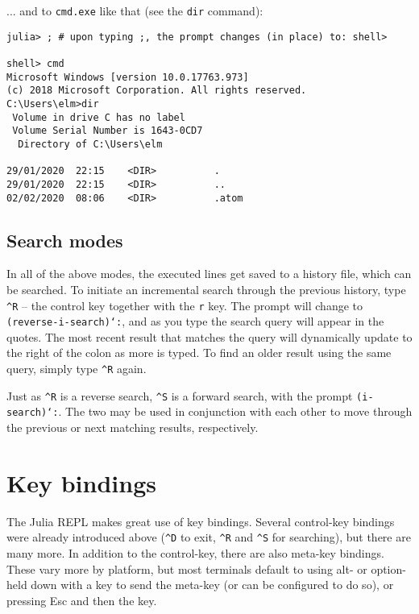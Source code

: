 ... and to \texttt{cmd.exe} like that (see the \texttt{dir} command):




\begin{verbatim}
julia> ; # upon typing ;, the prompt changes (in place) to: shell>

shell> cmd
Microsoft Windows [version 10.0.17763.973]
(c) 2018 Microsoft Corporation. All rights reserved.
C:\Users\elm>dir
 Volume in drive C has no label
 Volume Serial Number is 1643-0CD7
  Directory of C:\Users\elm

29/01/2020  22:15    <DIR>          .
29/01/2020  22:15    <DIR>          ..
02/02/2020  08:06    <DIR>          .atom
\end{verbatim}



\hypertarget{13961930499248375782}{}


\subsection{Search modes}



In all of the above modes, the executed lines get saved to a history file, which can be searched.  To initiate an incremental search through the previous history, type \texttt{{\textasciicircum}R} – the control key together with the \texttt{r} key. The prompt will change to \texttt{(reverse-i-search)`{\textquotesingle}:}, and as you type the search query will appear in the quotes. The most recent result that matches the query will dynamically update to the right of the colon as more is typed. To find an older result using the same query, simply type \texttt{{\textasciicircum}R} again.



Just as \texttt{{\textasciicircum}R} is a reverse search, \texttt{{\textasciicircum}S} is a forward search, with the prompt \texttt{(i-search)`{\textquotesingle}:}.  The two may be used in conjunction with each other to move through the previous or next matching results, respectively.



\hypertarget{11229238099061625177}{}


\section{Key bindings}



The Julia REPL makes great use of key bindings. Several control-key bindings were already introduced above (\texttt{{\textasciicircum}D} to exit, \texttt{{\textasciicircum}R} and \texttt{{\textasciicircum}S} for searching), but there are many more. In addition to the control-key, there are also meta-key bindings. These vary more by platform, but most terminals default to using alt- or option- held down with a key to send the meta-key (or can be configured to do so), or pressing Esc and then the key.




